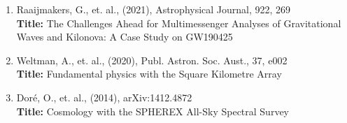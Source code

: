 \documentclass{article}
\newcommand{\apj}{Astrophysical Journal}
\newcommand{\pasa}{Publ. Astron. Soc. Aust.}
\begin{document}
{\addtolength{\leftskip}{10mm}
\begin{enumerate}[leftmargin=*,itemsep=0.45em,topsep=0.35em]
\item Raaijmakers, G., et. al., (2021), \apj, 922, 269 \\
\textbf{Title:} The Challenges Ahead for Multimessenger Analyses of Gravitational Waves and Kilonova: A Case Study on GW190425
\item Weltman, A., et. al., (2020), \pasa, 37, e002 \\
\textbf{Title:} Fundamental physics with the Square Kilometre Array
\item Doré, O., et. al., (2014), arXiv:1412.4872 \\
\textbf{Title:} Cosmology with the SPHEREX All-Sky Spectral Survey
\end{enumerate}
\par}
\end{document}

